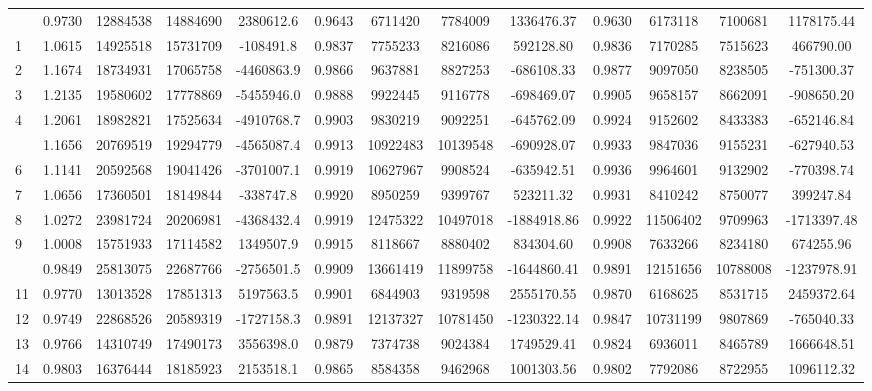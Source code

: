 \documentclass[
  12pt,
]{article}
\begin{document}
\begin{longtable}[t]{lcccccccccccc}
\endfoot
\bottomrule
\endlastfoot
0 & 0.9730 & 12884538 & 14884690 & 2380612.6 & 0.9643 & 6711420 & 7784009 & 1336476.37 & 0.9630 & 6173118 & 7100681 & 1178175.44\\
1 & 1.0615 & 14925518 & 15731709 & -108491.8 & 0.9837 & 7755233 & 8216086 & 592128.80 & 0.9836 & 7170285 & 7515623 & 466790.00\\
2 & 1.1674 & 18734931 & 17065758 & -4460863.9 & 0.9866 & 9637881 & 8827253 & -686108.33 & 0.9877 & 9097050 & 8238505 & -751300.37\\
3 & 1.2135 & 19580602 & 17778869 & -5455946.0 & 0.9888 & 9922445 & 9116778 & -698469.07 & 0.9905 & 9658157 & 8662091 & -908650.20\\
4 & 1.2061 & 18982821 & 17525634 & -4910768.7 & 0.9903 & 9830219 & 9092251 & -645762.09 & 0.9924 & 9152602 & 8433383 & -652146.84\\
\addlinespace
5 & 1.1656 & 20769519 & 19294779 & -4565087.4 & 0.9913 & 10922483 & 10139548 & -690928.07 & 0.9933 & 9847036 & 9155231 & -627940.53\\
6 & 1.1141 & 20592568 & 19041426 & -3701007.1 & 0.9919 & 10627967 & 9908524 & -635942.51 & 0.9936 & 9964601 & 9132902 & -770398.74\\
7 & 1.0656 & 17360501 & 18149844 & -338747.8 & 0.9920 & 8950259 & 9399767 & 523211.32 & 0.9931 & 8410242 & 8750077 & 399247.84\\
8 & 1.0272 & 23981724 & 20206981 & -4368432.4 & 0.9919 & 12475322 & 10497018 & -1884918.86 & 0.9922 & 11506402 & 9709963 & -1713397.48\\
9 & 1.0008 & 15751933 & 17114582 & 1349507.9 & 0.9915 & 8118667 & 8880402 & 834304.60 & 0.9908 & 7633266 & 8234180 & 674255.96\\
\addlinespace
10 & 0.9849 & 25813075 & 22687766 & -2756501.5 & 0.9909 & 13661419 & 11899758 & -1644860.41 & 0.9891 & 12151656 & 10788008 & -1237978.91\\
11 & 0.9770 & 13013528 & 17851313 & 5197563.5 & 0.9901 & 6844903 & 9319598 & 2555170.55 & 0.9870 & 6168625 & 8531715 & 2459372.64\\
12 & 0.9749 & 22868526 & 20589319 & -1727158.3 & 0.9891 & 12137327 & 10781450 & -1230322.14 & 0.9847 & 10731199 & 9807869 & -765040.33\\
13 & 0.9766 & 14310749 & 17490173 & 3556398.0 & 0.9879 & 7374738 & 9024384 & 1749529.41 & 0.9824 & 6936011 & 8465789 & 1666648.51\\
14 & 0.9803 & 16376444 & 18185923 & 2153518.1 & 0.9865 & 8584358 & 9462968 & 1001303.56 & 0.9802 & 7792086 & 8722955 & 1096112.32\\

\end{longtable}
\end{document}
